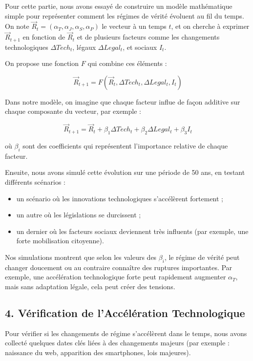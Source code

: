 \documentclass[12pt,a4paper]{report}
\begin{document}
Pour cette partie, nous avons essayé de construire un modèle mathématique simple pour représenter comment les régimes de vérité évoluent au fil du temps. On note \(\vec{R}_t = (\alpha_T, \alpha_J, \alpha_S, \alpha_P)\) le vecteur à un temps \(t\), et on cherche à exprimer \(\vec{R}_{t+1}\) en fonction de \(\vec{R}_t\) et de plusieurs facteurs comme les changements technologiques \(\Delta Tech_t\), légaux \(\Delta Legal_t\), et sociaux \(I_t\).

On propose une fonction \(F\) qui combine ces éléments :

\[
\vec{R}_{t+1} = F(\vec{R}_t, \Delta Tech_t, \Delta Legal_t, I_t)
\]

Dans notre modèle, on imagine que chaque facteur influe de façon additive sur chaque composante du vecteur, par exemple :

\[
\vec{R}_{t+1} = \vec{R}_t + \beta_1 \Delta Tech_t + \beta_2 \Delta Legal_t + \beta_3 I_t
\]

où \(\beta_i\) sont des coefficients qui représentent l’importance relative de chaque facteur.

Ensuite, nous avons simulé cette évolution sur une période de 50 ans, en testant différents scénarios :  
\begin{itemize}
	\item un scénario où les innovations technologiques s’accélèrent fortement ;  
	\item un autre où les législations se durcissent ;  
	\item un dernier où les facteurs sociaux deviennent très influents (par exemple, une forte mobilisation citoyenne).
\end{itemize}

Nos simulations montrent que selon les valeurs des \(\beta_i\), le régime de vérité peut changer doucement ou au contraire connaître des ruptures importantes. Par exemple, une accélération technologique forte peut rapidement augmenter \(\alpha_T\), mais sans adaptation légale, cela peut créer des tensions.

\subsection*{4. Vérification de l’Accélération Technologique}

Pour vérifier si les changements de régime s’accélèrent dans le temps, nous avons collecté quelques dates clés liées à des changements majeurs (par exemple : naissance du web, apparition des smartphones, lois majeures).
\end{document}
